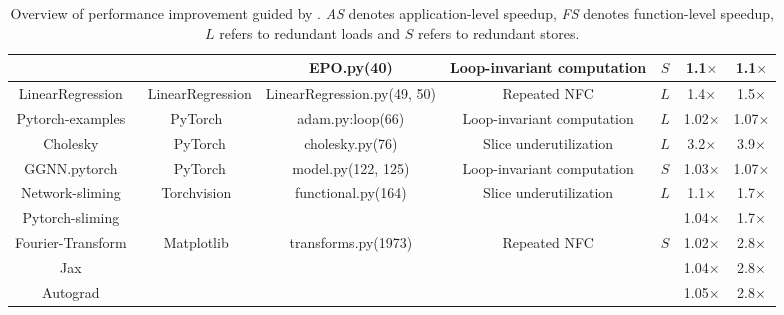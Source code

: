 \begin{table*}[!htbp]
{\begin{tabular}{||c|c|c||c|c||c|c||}
    \cline{3-7}
        &  & EPO.py(40)  & Loop-invariant computation & $S$ & 1.1$\times$  & 1.1$\times$    \\        
    \hline
        LinearRegression~\cite{linearregression} & LinearRegression   & LinearRegression.py(49, 50)  & Repeated NFC  & $L$ & 1.4$\times$  & 1.5$\times$    \\
    \hline
        Pytorch-examples~\cite{pytorch-example} & PyTorch~\cite{paszke2017automatic}  & adam.py:loop(66)  & Loop-invariant computation  & $L$ &  1.02$\times$ & 1.07$\times$     \\ 
    \hline
        Cholesky~\cite{zhou2020harp} & PyTorch  & cholesky.py(76)  & Slice underutilization  & $L$ & 3.2$\times$  & 3.9$\times$    \\
    \hline
        GGNN.pytorch~\cite{ggnn} & PyTorch  & model.py(122, 125)  & Loop-invariant computation & $S$  &  1.03$\times$  &  1.07$\times$   \\
    \hline
        Network-sliming~\cite{Liu_2017_ICCV} & \multirow{2}{*}{Torchvision~\cite{torchvision}}  & \multirow{2}{*}{functional.py(164)}  & \multirow{2}{*}{Slice underutilization} & \multirow{2}{*}{$L$}  & 1.1$\times$  &  1.7$\times$ \\
    \cline{1-1}
    \cline{6-7}
        Pytorch-sliming~\cite{Liu_2017_ICCV} &   &   &   &  & 1.04$\times$ &  1.7$\times$ \\
    \hline
        Fourier-Transform~\cite{fourier} & \multirow{3}{*}{Matplotlib~\cite{Hunter:2007}}  & \multirow{3}{*}{transforms.py(1973)} & \multirow{3}{6em}{Repeated NFC}   & \multirow{3}{*}{$S$} & 1.02$\times$  & 2.8$\times$    \\
    \cline{1-1}
    \cline{6-7}
        Jax~\cite{jax2018github} &   &  &   &   & 1.04$\times$  & 2.8$\times$  \\    
    \cline{1-1}
    \cline{6-7}
        Autograd~\cite{autograd} &   &   &   &   & 1.05$\times$  & 2.8$\times$  \\  
    \hline


    
    \end{tabular}
    }
    \caption{Overview of performance improvement guided by \tool. {\it AS} denotes application-level speedup, {\it FS} denotes function-level speedup, $L$ refers to redundant loads and $S$ refers to redundant stores.}
    \label{table}
\end{table*}


